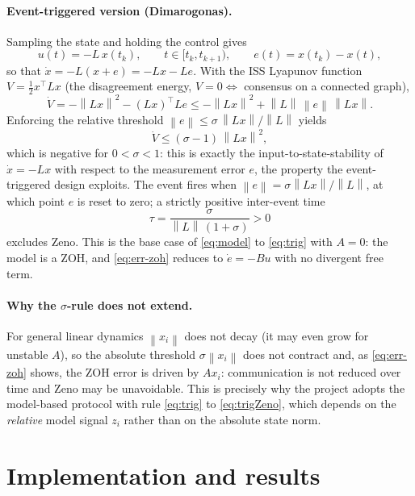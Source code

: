 \documentclass[11pt,a4paper]{article}
\theoremstyle{remark}
\newcommand{\norm}[1]{\left\lVert#1\right\rVert}
\newcommand{\T}{^{\top}}
\begin{document}
\paragraph{Event-triggered version (Dimarogonas).} Sampling the state and holding the control gives
\begin{equation}
u(t) = -L\,x(t_k), \qquad t\in[t_k,t_{k+1}), \qquad e(t)=x(t_k)-x(t),
\label{eq:dima-et}
\end{equation}
so that $\dot x=-L(x+e)=-Lx-Le$. With the ISS Lyapunov function $V=\tfrac12 x\T L x$ (the
disagreement energy, $V=0\iff$ consensus on a connected graph),
\begin{equation}
\dot V = -\norm{Lx}^2-(Lx)\T Le \le -\norm{Lx}^2+\norm{L}\,\norm{e}\,\norm{Lx}.
\end{equation}
Enforcing the relative threshold $\norm{e}\le\sigma\,\norm{Lx}/\norm{L}$ yields
\begin{equation}
\dot V \le (\sigma-1)\,\norm{Lx}^2,
\end{equation}
which is negative for $0<\sigma<1$: this is exactly the input-to-state-stability of $\dot x=-Lx$
with respect to the measurement error $e$, the property the event-triggered design exploits. The
event fires when $\norm{e}=\sigma\norm{Lx}/\norm{L}$, at which point $e$ is reset to zero; a
strictly positive inter-event time
\begin{equation}
\tau = \frac{\sigma}{\norm{L}\,(1+\sigma)} > 0
\label{eq:dima-dwell}
\end{equation}
excludes Zeno. This is the base case of \eqref{eq:model} to \eqref{eq:trig} with $A=0$: the model is a
ZOH, and \eqref{eq:err-zoh} reduces to $\dot e=-Bu$ with no divergent free term.

\paragraph{Why the $\sigma$-rule does not extend.} For general linear dynamics $\norm{x_i}$ does not
decay (it may even grow for unstable $A$), so the absolute threshold $\sigma\norm{x_i}$ does not
contract and, as \eqref{eq:err-zoh} shows, the ZOH error is driven by $Ax_i$: communication is not
reduced over time and Zeno may be unavoidable. This is precisely why the project adopts the
model-based protocol with rule \eqref{eq:trig} to \eqref{eq:trigZeno}, which depends on the
\emph{relative} model signal $z_i$ rather than on the absolute state norm.

\section{Implementation and results}
\end{document}
